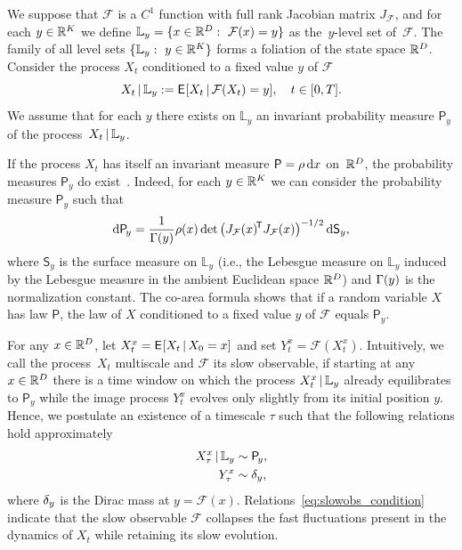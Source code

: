 \documentclass{article}
\newcommand{\obs}{\mathcal{F}} %
\newcommand{\levs}{\mathbb{L}} %
\newcommand{\invm}{\mathsf{P}} %
\newcommand{\invd}{\rh} %
\newcommand{\jac}[1]{J_{#1}} %
\begin{document}
We suppose that $\obs$ is a $C^1$ function with full rank Jacobian matrix $\jac{\obs}$, and for each $y\in\R^K$ we define $\levs_y=\{x\in\R^D:\ \obs(x)=y\}$ as the~$y$-level set of~$\obs$. The family of all level sets $\{\levs_y:\ y\in\R^K\}$ forms a foliation of the state space $\R^D$. Consider the process $X_t$ conditioned to a fixed value $y$ of $\obs$
\begin{equation*}
    X_t\cbar\levs_y := \Exp[][X_t\cbar \obs(X_t)=y],\quad t\in[0,T].
\end{equation*}
We assume that for each $y$ there exists on $\levs_y$ an invariant probability measure $\invm_{\!y}$ of the process~$X_t\cbar\levs_y$.\medskip

\begin{rem}
If the process $X_t$ has itself an invariant measure $\invm=\invd\der{x}$ on~$\R^D$, the probability measures $\invm_{\!y}$ do exist~\cite{legoll_effective_2010}. Indeed, for each $y\in\R^K$ we can consider the probability measure $\invm_{\!y}$ such that
\begin{equation}
    \der{\invm_{\!y}} = \frac{1}{\Ga(y)}\rh(x)\det\big(\tp{\jac{\obs}(x)}\jac{\obs}(x)\big)^{-1/2}\der{\mathsf{S}_y},
\end{equation}
where $\mathsf{S}_y$ is the surface measure on $\levs_y$ (i.e., the Lebesgue measure on $\levs_y$ induced by the Lebesgue measure in the ambient Euclidean space $\R^D$) and $\Ga(y)$ is the normalization constant. The co-area formula shows that if a random variable $X$ has law $\invm$, the law of $X$ conditioned to a fixed value $y$ of $\obs$ equals $\invm_{\!y}$.
\end{rem}

For any $x\in\R^D$, let $X^x_t = \Exp[][X_t\cbar X_0=x]$ and set $Y^x_t=\obs(X^x_t)$.
Intuitively, we call the process~$X_t$ multiscale and $\obs$ its slow observable, if starting at any $x\in\R^D$ there is a time window on which the process $X^x_t\cbar\levs_y$ already equilibrates to $\invm_{\!y}$ while the image process $Y^x_t$ evolves only slightly from its initial position $y$. Hence, we postulate an existence of a timescale $\tau$ such that the following relations hold approximately
\begin{gather}\label{eq:slowobs_condition}
\begin{aligned}
    X^x_\tau\cbar \levs_y &\sim \invm_{\!y},\\
    Y^x_\tau &\sim \de_y,
\end{aligned}
\end{gather}
where $\de_y$ is the Dirac mass at $y=\obs(x)$. Relations~\eqref{eq:slowobs_condition} indicate that the slow observable $\obs$ collapses the fast fluctuations present in the dynamics of $X_t$ while retaining its slow evolution.
\end{document}
